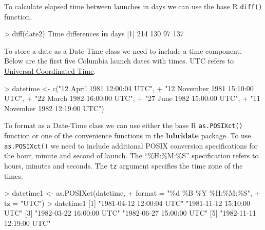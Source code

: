 \documentclass[
]{book}
\newenvironment{Shaded}{\begin{snugshade}}{\end{snugshade}}
\newcommand{\AttributeTok}[1]{\textcolor[rgb]{0.77,0.63,0.00}{#1}}
\newcommand{\ControlFlowTok}[1]{\textcolor[rgb]{0.13,0.29,0.53}{\textbf{#1}}}
\newcommand{\DecValTok}[1]{\textcolor[rgb]{0.00,0.00,0.81}{#1}}
\newcommand{\FunctionTok}[1]{\textcolor[rgb]{0.00,0.00,0.00}{#1}}
\newcommand{\NormalTok}[1]{#1}
\newcommand{\OtherTok}[1]{\textcolor[rgb]{0.56,0.35,0.01}{#1}}
\newcommand{\SpecialCharTok}[1]{\textcolor[rgb]{0.00,0.00,0.00}{#1}}
\newcommand{\StringTok}[1]{\textcolor[rgb]{0.31,0.60,0.02}{#1}}
\begin{document}
To calculate elapsed time between launches in days we can use the base R \texttt{diff()} function.

\begin{Shaded}
\begin{Highlighting}[]
\SpecialCharTok{\textgreater{}} \FunctionTok{diff}\NormalTok{(date2)}
\NormalTok{Time differences }\ControlFlowTok{in}\NormalTok{ days}
\NormalTok{[}\DecValTok{1}\NormalTok{] }\DecValTok{214} \DecValTok{130}  \DecValTok{97} \DecValTok{137}
\end{Highlighting}
\end{Shaded}

To store a date as a Date-Time class we need to include a time component. Below are the first five Columbia launch dates with times. UTC refers to \href{https://en.wikipedia.org/wiki/Coordinated_Universal_Time}{Universal Coordinated Time}.

\begin{Shaded}
\begin{Highlighting}[]
\SpecialCharTok{\textgreater{}}\NormalTok{ datetime }\OtherTok{\textless{}{-}} \FunctionTok{c}\NormalTok{(}\StringTok{"12 April 1981 12:00:04 UTC"}\NormalTok{,}
\SpecialCharTok{+}               \StringTok{"12 November 1981 15:10:00 UTC"}\NormalTok{,}
\SpecialCharTok{+}               \StringTok{"22 March 1982 16:00:00 UTC"}\NormalTok{,}
\SpecialCharTok{+}               \StringTok{"27 June 1982 15:00:00 UTC"}\NormalTok{,}
\SpecialCharTok{+}               \StringTok{"11 November 1982 12:19:00 UTC"}\NormalTok{)}
\end{Highlighting}
\end{Shaded}

To format as a Date-Time class we can use either the base R \texttt{as.POSIXct()} function or one of the convenience functions in the \textbf{lubridate} package. To use \texttt{as.POSIXct()} we need to include additional POSIX conversion specifications for the hour, minute and second of launch. The ``\%H:\%M:\%S'' specification refers to hours, minutes and seconds. The \texttt{tz} argument specifies the time zone of the times.

\begin{Shaded}
\begin{Highlighting}[]
\SpecialCharTok{\textgreater{}}\NormalTok{ datetime1 }\OtherTok{\textless{}{-}} \FunctionTok{as.POSIXct}\NormalTok{(datetime, }
\SpecialCharTok{+}                         \AttributeTok{format =} \StringTok{"\%d \%B \%Y \%H:\%M:\%S"}\NormalTok{, }
\SpecialCharTok{+}                         \AttributeTok{tz =} \StringTok{"UTC"}\NormalTok{)}
\SpecialCharTok{\textgreater{}}\NormalTok{ datetime1}
\NormalTok{[}\DecValTok{1}\NormalTok{] }\StringTok{"1981{-}04{-}12 12:00:04 UTC"} \StringTok{"1981{-}11{-}12 15:10:00 UTC"}
\NormalTok{[}\DecValTok{3}\NormalTok{] }\StringTok{"1982{-}03{-}22 16:00:00 UTC"} \StringTok{"1982{-}06{-}27 15:00:00 UTC"}
\NormalTok{[}\DecValTok{5}\NormalTok{] }\StringTok{"1982{-}11{-}11 12:19:00 UTC"}
\end{Highlighting}
\end{Shaded}
\end{document}

